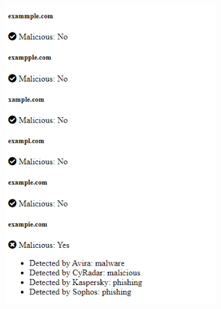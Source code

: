 \begin{figure}[H]
  \centering
  \begin{subfigure}[b]{0.45\textwidth}
    \includegraphics[width=\textwidth]{project/inhg.png}
    \label{fig:left}
  \end{subfigure}
  \hfill %
  \begin{subfigure}[b]{0.45\textwidth}

\end{subfigure}
\end{figure}
